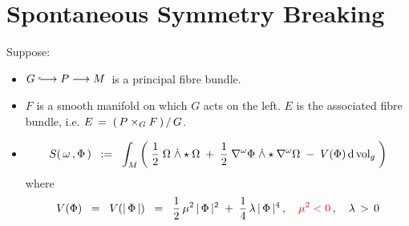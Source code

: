 

\section{Spontaneous Symmetry Breaking}
\setcounter{theorem}{0}
\setcounter{equation}{0}


\renewcommand{\theenumi}{\roman{enumi}}
\renewcommand{\labelenumi}{\textnormal{(\theenumi)}$\;\;$}


Suppose:
\begin{itemize}
\item
	$G \longhookrightarrow P \longrightarrow M$\,
	is a principal fibre bundle.
\item
	$F$ is a smooth manifold on which $G$ acts on the left.
	$E$ is the associated fibre bundle, i.e. $E \,=\, \left.\left(\,P \times_{G} F\,\right)\,\right\slash G$.
\item
	\begin{equation*}
	S\!\left(\,\omega\,,\Phi\,\right)
	\;\; := \;\;
		\int_{M}\left(\;
			\dfrac{1}{2}\;\Omega\;\dot{\wedge}\star\Omega
			\;+\;
			\dfrac{1}{2}\;\nabla^{\omega}\Phi\;\dot{\wedge} \star\nabla^{\omega}\Omega
			\;-\;
			V(\Phi)\,\textnormal{d}\,\textnormal{vol}_{g} 
			\;\right)
	\end{equation*}
	where
	\begin{equation*}
	V(\Phi) \;\; = \;\; V(\vert\,\Phi\,\vert)
	\;\; = \;\;
		\dfrac{1}{2}\,\mu^{2}\,\vert\,\Phi\,\vert^{2}
		\;+\;
		\dfrac{1}{4}\,\lambda\,\vert\,\Phi\,\vert^{4}\,,
	\quad
	{\color{red}\mu^{2} < 0}\,,
	\quad
	\lambda \, > \, 0
	\end{equation*}
\end{itemize}


\begin{theorem}
\mbox{}
\vskip 0.2cm
\noindent
\end{theorem}



